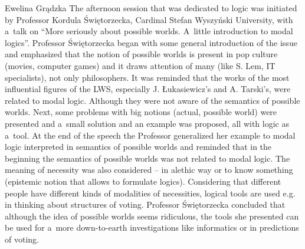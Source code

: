 \begin{editorialeng}{Ewelina Grądzka}
The afternoon session that was dedicated to logic was initiated by Professor Kordula Świętorzecka, Cardinal Stefan Wyszyński University, with a~talk on ``More seriously about possible worlds. A~little introduction to modal logics''. Professor Świętorzecka began with some general introduction of the issue and emphasized that the notion of possible worlds is present in pop culture (movies, computer games) and it draws attention of many (like S. Lem, IT specialists), not only philosophers. It was reminded that the works of the most influential figures of the LWS, especially J. Łukasiewicz’s and A. Tarski’s, were related to modal logic. Although they were not aware of the semantics of possible worlds. Next, some problems with big notions (actual, possible world) were presented and a~small solution and an example was proposed, all with logic as a~tool. At the end of the speech the Professor generalized her example to modal logic interpreted in semantics of possible worlds and reminded that in the beginning the semantics of possible worlds was not related to modal logic. The meaning of necessity was also considered – in alethic way or to know something (epistemic notion that allows to formulate logics). Considering that different people have different kinds of modalities of necessities, logical tools are used e.g. in thinking about structures of voting. Professor Świętorzecka concluded that although the idea of possible worlds seems ridiculous, the tools she presented can be used for a~more down-to-earth investigations like informatics or in predictions of voting.


\end{editorialeng}
